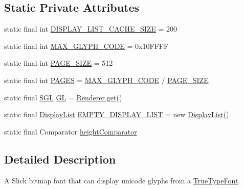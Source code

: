 \subsection*{Static Private Attributes}
\begin{DoxyCompactItemize}
\item 
static final int \mbox{\hyperlink{classorg_1_1newdawn_1_1slick_1_1_unicode_font_ad52862349941296468fcaa685f49f8a4}{D\+I\+S\+P\+L\+A\+Y\+\_\+\+L\+I\+S\+T\+\_\+\+C\+A\+C\+H\+E\+\_\+\+S\+I\+ZE}} = 200
\item 
static final int \mbox{\hyperlink{classorg_1_1newdawn_1_1slick_1_1_unicode_font_af7c51e9668f8b88349f99c2657c3cfb6}{M\+A\+X\+\_\+\+G\+L\+Y\+P\+H\+\_\+\+C\+O\+DE}} = 0x10\+F\+F\+FF
\item 
static final int \mbox{\hyperlink{classorg_1_1newdawn_1_1slick_1_1_unicode_font_a110d1298690119984f9cd1cae732fd55}{P\+A\+G\+E\+\_\+\+S\+I\+ZE}} = 512
\item 
static final int \mbox{\hyperlink{classorg_1_1newdawn_1_1slick_1_1_unicode_font_a2f1bf2ab8649b6db562d35e9c2fa1bcd}{P\+A\+G\+ES}} = \mbox{\hyperlink{classorg_1_1newdawn_1_1slick_1_1_unicode_font_af7c51e9668f8b88349f99c2657c3cfb6}{M\+A\+X\+\_\+\+G\+L\+Y\+P\+H\+\_\+\+C\+O\+DE}} / \mbox{\hyperlink{classorg_1_1newdawn_1_1slick_1_1_unicode_font_a110d1298690119984f9cd1cae732fd55}{P\+A\+G\+E\+\_\+\+S\+I\+ZE}}
\item 
static final \mbox{\hyperlink{interfaceorg_1_1newdawn_1_1slick_1_1opengl_1_1renderer_1_1_s_g_l}{S\+GL}} \mbox{\hyperlink{classorg_1_1newdawn_1_1slick_1_1_unicode_font_a00797c33470cfc4443b6c24d7a48c2b1}{GL}} = \mbox{\hyperlink{classorg_1_1newdawn_1_1slick_1_1opengl_1_1renderer_1_1_renderer_abe742c3a7dfca67c6c01821d27087308}{Renderer.\+get}}()
\item 
static final \mbox{\hyperlink{classorg_1_1newdawn_1_1slick_1_1_unicode_font_1_1_display_list}{Display\+List}} \mbox{\hyperlink{classorg_1_1newdawn_1_1slick_1_1_unicode_font_a8c41970ed703dd55d0405bf5f4a39dbd}{E\+M\+P\+T\+Y\+\_\+\+D\+I\+S\+P\+L\+A\+Y\+\_\+\+L\+I\+ST}} = new \mbox{\hyperlink{classorg_1_1newdawn_1_1slick_1_1_unicode_font_1_1_display_list}{Display\+List}}()
\item 
static final Comparator \mbox{\hyperlink{classorg_1_1newdawn_1_1slick_1_1_unicode_font_a45941677f56ea53fdc25e7d20f6cd32f}{height\+Comparator}}
\end{DoxyCompactItemize}


\subsection{Detailed Description}
A Slick bitmap font that can display unicode glyphs from a \mbox{\hyperlink{classorg_1_1newdawn_1_1slick_1_1_true_type_font}{True\+Type\+Font}}.

